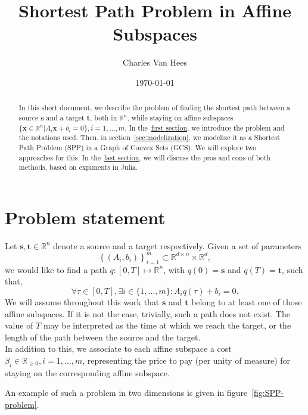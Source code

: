 \documentclass[a4paper, 12pt]{article}
\title{\vspace{-0.6cm}Shortest Path Problem in Affine Subspaces}
\author{Charles Van Hees}
\date{\today}
\newlength{\indentsize}
\begin{document}
\maketitle

\begin{abstract}
    In this short document, we describe the problem of finding the shortest path between a source $\mathbf{s}$ and a target $\mathbf{t}$, both in $\mathbb{R}^n$, while staying on affine subspaces $\{\mathbf{x} \in \mathbb{R}^n \vert A_i \mathbf{x} + b_i = 0\}, i = 1, \dots, m$. In the~\hyperref[sec:statement]{first section}, we introduce the problem and the notations used. Then, in section~\ref{sec:modelization}, we modelize it as a Shortest Path Problem (SPP) in a Graph of Convex Sets (GCS). We will explore two approaches for this. In the~\hyperref[sec:experiments]{last section}, we will discuss the pros and cons of both methods, based on expiments in Julia.
\end{abstract}

\section{Problem statement}\label{sec:statement}
\hspace{\indentsize} Let $\mathbf{s}, \mathbf{t} \in \mathbb{R}^n$ denote a source and a target respectively. Given a set of parameters \[{\left\{(A_i, b_i)\right\}}_{i=1}^{m} \subset \mathbb{R}^{d \times n} \times \mathbb{R}^d,\] we would like to find a path $q : [0,T] \mapsto \mathbb{R}^n$, with $q(0) = \mathbf{s}$ and $q(T) = \mathbf{t}$, such that, \[\forall \tau \in [0,T], \exists i \in \{1, \dots, m\} : A_i q(\tau) + b_i = 0.\] We will assume throughout this work that $\mathbf{s}$ and $\mathbf{t}$ belong to at least one of those affine subspaces. If it is not the case, trivially, such a path does not exist. The value of $T$ may be interpreted as the time at which we reach the target, or the length of the path between the source and the target.\\
In addition to this, we associate to each affine subspace a cost $\beta_i \in \mathbb{R}_{\geq 0}, i = 1, \dots, m$, representing the price to pay (per unity of measure) for staying on the corresponding affine subspace.

An example of such a problem in two dimensions is given in figure~\ref{fig:SPP-problem}.
\end{document}
